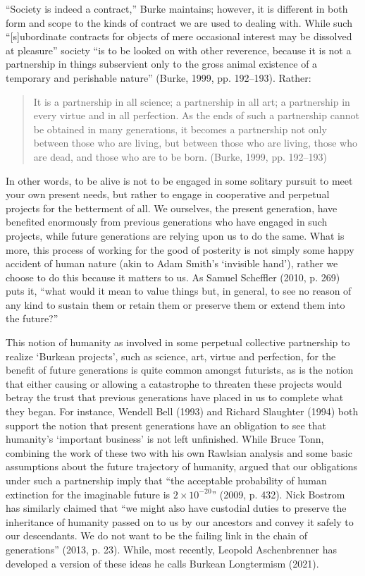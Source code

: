 \documentclass[man,11pt,a4paper]{apa7}
\begin{document}
``Society is indeed a contract,'' Burke maintains; however, it is different in both form and scope to the kinds of contract we are used to dealing with. While such ``[s]ubordinate contracts for objects of mere occasional interest may be dissolved at pleasure'' society ``is to be looked on with other reverence, because it is not a partnership in things subservient only to the gross animal existence of a temporary and perishable nature'' (Burke, 1999, pp. 192--193). Rather:

\begin{quote}
It is a partnership in all science; a partnership in all art; a partnership in every virtue and in all perfection. As the ends of such a partnership cannot be obtained in many generations, it becomes a partnership not only between those who are living, but between those who are living, those who are dead, and those who are to be born. (Burke, 1999, pp. 192--193)
\end{quote}

In other words, to be alive is not to be engaged in some solitary pursuit to meet your own present needs, but rather to engage in cooperative and perpetual projects for the betterment of all. We ourselves, the present generation, have benefited enormously from previous generations who have engaged in such projects, while future generations are relying upon us to do the same. What is more, this process of working for the good of posterity is not simply some happy accident of human nature (akin to Adam Smith's `invisible hand'), rather we choose to do this because it matters to us. As Samuel Scheffler (2010, p. 269) puts it, ``what would it mean to value things but, in general, to see no reason of any kind to sustain them or retain them or preserve them or extend them into the future?''

This notion of humanity as involved in some perpetual collective partnership to realize `Burkean projects', such as science, art, virtue and perfection, for the benefit of future generations is quite common amongst futurists, as is the notion that either causing or allowing a catastrophe to threaten these projects would betray the trust that previous generations have placed in us to complete what they began. For instance, Wendell Bell (1993) and Richard Slaughter (1994) both support the notion that present generations have an obligation to see that humanity's `important business' is not left unfinished. While Bruce Tonn, combining the work of these two with his own Rawlsian analysis and some basic assumptions about the future trajectory of humanity, argued that our obligations under such a partnership imply that ``the acceptable probability of human extinction for the imaginable future is $2 \times 10^{-20}$'' (2009, p. 432). Nick Bostrom has similarly claimed that ``we might also have custodial duties to preserve the inheritance of humanity passed on to us by our ancestors and convey it safely to our descendants. We do not want to be the failing link in the chain of generations'' (2013, p. 23). While, most recently, Leopold Aschenbrenner has developed a version of these ideas he calls Burkean Longtermism (2021).
\end{document}
